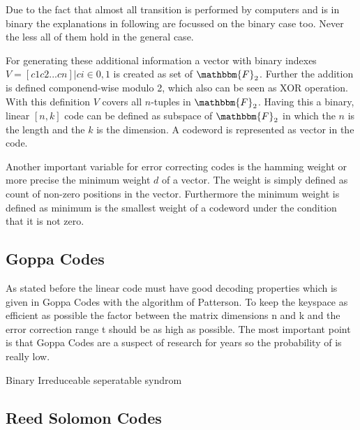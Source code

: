 Due to the fact that almost all transition is performed by computers and is in binary the explanations in following are focussed on the binary case too. Never the less all of them hold in the general case. 

For generating these additional information a vector with binary indexes $V = {[c1 c2...cn] |ci \in {0, 1}}$ is created as set of $\mathbbm{F}_2$. Further the addition is defined componend-wise modulo 2, which also can be seen as XOR operation. With this definition $V$ covers all $n$-tuples in $\mathbbm{F}_2$. 
Having this a binary, linear $[n, k]$ code can be defined as subspace of $\mathbbm{F}_2$ in which the $n$ is the length and the $k$ is the dimension. A codeword is represented as vector in the code.
 

Another important variable for error correcting codes is the hamming weight or more precise the minimum weight $d$ of a vector. The weight is simply defined as count of non-zero positions in the vector. Furthermore the minimum weight is defined as minimum is the smallest weight of a codeword under the condition that it is not zero. 

\subsection*{Goppa Codes}
As stated before the linear code must have good decoding properties which is given in Goppa Codes with the algorithm of Patterson. To keep the keyspace as efficient as possible the factor between the matrix dimensions n and k and the error correction range t should be as high as possible. The most important point is that Goppa Codes are a suspect of research for years so the probability of is really low. 

Binary
Irreduceable
seperatable
syndrom
\subsection*{Reed Solomon Codes}

